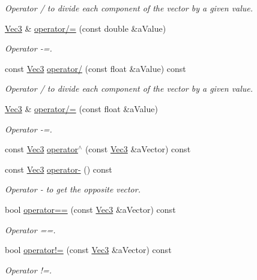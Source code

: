 \begin{DoxyCompactItemize}
\begin{DoxyCompactList}\small\item\em Operator / to divide each component of the vector by a given value. \end{DoxyCompactList}\item 
\hyperlink{class_math_1_1_vec3}{Vec3} \& \hyperlink{class_math_1_1_vec3_a94a0ad94c50a92e7df4ef2eaa80b646d}{operator/=} (const double \&aValue)
\begin{DoxyCompactList}\small\item\em Operator -\/=. \end{DoxyCompactList}\item 
const \hyperlink{class_math_1_1_vec3}{Vec3} \hyperlink{class_math_1_1_vec3_a7b6edfec60d0610b207468266cef5f62}{operator/} (const float \&aValue) const 
\begin{DoxyCompactList}\small\item\em Operator / to divide each component of the vector by a given value. \end{DoxyCompactList}\item 
\hyperlink{class_math_1_1_vec3}{Vec3} \& \hyperlink{class_math_1_1_vec3_a133821008073a67584bf7efe5996222a}{operator/=} (const float \&aValue)
\begin{DoxyCompactList}\small\item\em Operator -\/=. \end{DoxyCompactList}\item 
const \hyperlink{class_math_1_1_vec3}{Vec3} \hyperlink{class_math_1_1_vec3_a3d2915ed100ea1cb23835fc6face8463}{operator$^\wedge$} (const \hyperlink{class_math_1_1_vec3}{Vec3} \&aVector) const 
\item 
const \hyperlink{class_math_1_1_vec3}{Vec3} \hyperlink{class_math_1_1_vec3_ad28e2086bad77ee4d341b8afa1590ca5}{operator-\/} () const 
\begin{DoxyCompactList}\small\item\em Operator -\/ to get the opposite vector. \end{DoxyCompactList}\item 
bool \hyperlink{class_math_1_1_vec3_a59cf913584768084bc2a557b230f2832}{operator==} (const \hyperlink{class_math_1_1_vec3}{Vec3} \&aVector) const 
\begin{DoxyCompactList}\small\item\em Operator ==. \end{DoxyCompactList}\item 
bool \hyperlink{class_math_1_1_vec3_afeec0386f8d8c80c93476e317cf4442e}{operator!=} (const \hyperlink{class_math_1_1_vec3}{Vec3} \&aVector) const 
\begin{DoxyCompactList}\small\item\em Operator !=. \end{DoxyCompactList}\end{DoxyCompactItemize}
